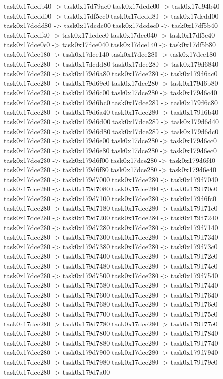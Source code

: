 {	task0x17dcdb40 -> task0x17d79ac0
	task0x17dcdc00 -> task0x17d94b40
	task0x17dcdd00 -> task0x17df5cc0
	task0x17dcdd80 -> task0x17dcdd00
	task0x17dcdd80 -> task0x17dcdc00
	task0x17dcdec0 -> task0x17df5b40
	task0x17dcdf40 -> task0x17dcdec0
	task0x17dce040 -> task0x17df5c40
	task0x17dce0c0 -> task0x17dce040
	task0x17dce140 -> task0x17df5b80
	task0x17dce180 -> task0x17dce140
	task0x17dce280 -> task0x17dce180
	task0x17dce280 -> task0x17dcdd80
	task0x17dce280 -> task0x179d6840
	task0x17dce280 -> task0x179d6a80
	task0x17dce280 -> task0x179d6ac0
	task0x17dce280 -> task0x179d69c0
	task0x17dce280 -> task0x179d6b80
	task0x17dce280 -> task0x179d6c00
	task0x17dce280 -> task0x179d6c40
	task0x17dce280 -> task0x179d6bc0
	task0x17dce280 -> task0x179d6c80
	task0x17dce280 -> task0x179d6a40
	task0x17dce280 -> task0x179d6b40
	task0x17dce280 -> task0x179d6d00
	task0x17dce280 -> task0x179d6d40
	task0x17dce280 -> task0x179d6d80
	task0x17dce280 -> task0x179d6dc0
	task0x17dce280 -> task0x179d6e00
	task0x17dce280 -> task0x179d6cc0
	task0x17dce280 -> task0x179d6e80
	task0x17dce280 -> task0x179d6ec0
	task0x17dce280 -> task0x179d6f00
	task0x17dce280 -> task0x179d6f40
	task0x17dce280 -> task0x179d6f80
	task0x17dce280 -> task0x179d6e40
	task0x17dce280 -> task0x179d7000
	task0x17dce280 -> task0x179d7040
	task0x17dce280 -> task0x179d7080
	task0x17dce280 -> task0x179d70c0
	task0x17dce280 -> task0x179d7100
	task0x17dce280 -> task0x179d6fc0
	task0x17dce280 -> task0x179d7180
	task0x17dce280 -> task0x179d71c0
	task0x17dce280 -> task0x179d7200
	task0x17dce280 -> task0x179d7240
	task0x17dce280 -> task0x179d7280
	task0x17dce280 -> task0x179d7140
	task0x17dce280 -> task0x179d7300
	task0x17dce280 -> task0x179d7340
	task0x17dce280 -> task0x179d7380
	task0x17dce280 -> task0x179d73c0
	task0x17dce280 -> task0x179d7400
	task0x17dce280 -> task0x179d72c0
	task0x17dce280 -> task0x179d7480
	task0x17dce280 -> task0x179d74c0
	task0x17dce280 -> task0x179d7500
	task0x17dce280 -> task0x179d7540
	task0x17dce280 -> task0x179d7580
	task0x17dce280 -> task0x179d7440
	task0x17dce280 -> task0x179d7600
	task0x17dce280 -> task0x179d7640
	task0x17dce280 -> task0x179d7680
	task0x17dce280 -> task0x179d76c0
	task0x17dce280 -> task0x179d7700
	task0x17dce280 -> task0x179d75c0
	task0x17dce280 -> task0x179d7780
	task0x17dce280 -> task0x179d77c0
	task0x17dce280 -> task0x179d7800
	task0x17dce280 -> task0x179d7840
	task0x17dce280 -> task0x179d7880
	task0x17dce280 -> task0x179d7740
	task0x17dce280 -> task0x179d7900
	task0x17dce280 -> task0x179d7940
	task0x17dce280 -> task0x179d7980
	task0x17dce280 -> task0x179d79c0
	task0x17dce280 -> task0x179d7a00
}

